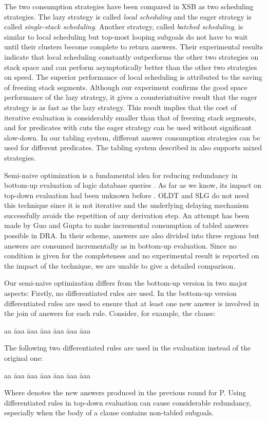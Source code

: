\documentclass{tlp}
\begin{document}
The two consumption strategies have been compared in XSB \cite{Freire98} as two scheduling strategies. The lazy strategy is called {\it local scheduling} and the eager strategy is called {\it single-stack scheduling}. Another strategy, called {\it batched scheduling}, is similar to local scheduling but top-most looping subgoals do not have to wait until their clusters become complete to return answers. Their experimental results indicate that local scheduling constantly outperforms the other two strategies on stack space and can perform asymptotically better than the other two strategies on speed. The superior performance of local scheduling is attributed to the saving of freezing stack segments. Although our experiment confirms the good space performance of the lazy strategy, it gives a counterintuitive result that the eager strategy is as fast as the lazy strategy. This result implies that the cost of iterative evaluation is considerably smaller than that of freezing stack segments, and for predicates with cuts the eager strategy can be used without significant slow-down. In our tabling system, different answer consumption strategies can be used for different predicates. The tabling system described in \cite{Rocha05} also supports mixed strategies.

Semi-naive optimization is a fundamental idea for reducing redundancy in bottom-up evaluation of logic database queries \cite{Banc86,Ullman88}. As far as we know, its impact on top-down evaluation had been unknown before \cite{Zhou04}. OLDT \cite{Tamaki86} and SLG \cite{Sagonas98} do not need this technique since it is not iterative and the underlying delaying mechanism successfully avoids the repetition of any derivation step. An attempt has been made by Guo and Gupta \cite{Guo01} to make incremental consumption of tabled answers possible in DRA. In their scheme, answers are also divided into three regions but answers are consumed incrementally as in bottom-up evaluation. Since no condition is given for the completeness and no experimental result is reported on the impact of the technique, we are unable to give a detailed comparison.

Our semi-naive optimization differs from the bottom-up version in two major aspects: Firstly, no differentiated rules are used. In the bottom-up version differentiated rules are used to ensure that at least one new answer is involved in the join of answers for each rule. Consider, for example, the clause:
\begin{tabbing}
aa \= aaa \= aaa \= aaa \= aaa \= aaa \= aaa \kill
\> 
\end{tabbing}
The following two differentiated rules are used in the evaluation instead of the original one:
\begin{tabbing}
aa \= aaa \= aaa \= aaa \= aaa \= aaa \= aaa \kill
\>  \\
\> 
\end{tabbing}
Where  denotes the new answers produced in the previous round for P. Using differentiated rules in top-down evaluation can cause considerable redundancy, especially when the body of a clause contains non-tabled subgoals.
\end{document}
